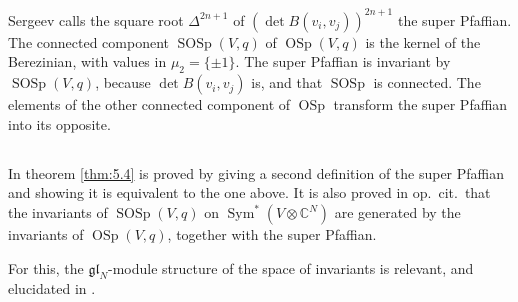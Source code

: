 \documentclass[11pt,a4paper]{article}
\theoremstyle{plain}
\theoremstyle{definition}
\DeclareMathOperator{\OSp}{OSp}
\DeclareMathOperator{\SOSp}{SOSp}
\DeclareMathOperator{\Sym}{Sym}
\newcommand{\C}{\mathbb{C}}
\begin{document}
\subsection{}
Sergeev calls the square root $\Delta^{2n+1}$ of $(\det B(v_i, v_j))^{2n+1}$ the super Pfaffian. The connected component $\SOSp(V,q)$ of $\OSp(V,q)$ is the kernel of the Berezinian, with values in $\mu_2 = \{\pm 1\}$. The super Pfaffian is invariant by $\SOSp(V,q)$, because $\det B(v_i, v_j)$ is, and that $\SOSp$ is connected. The elements of the other connected component of $\OSp$ transform the super Pfaffian into its opposite.

\subsection{}
In \cite{LZ15} theorem \ref{thm:5.4} is proved by giving a second definition of the super Pfaffian and showing it is equivalent to the one above. It is also proved in op.\ cit.\ that the invariants of $\SOSp(V,q)$ on $\Sym^*(V \otimes \C^N)$ are generated by the invariants of $\OSp(V,q)$, together with the super Pfaffian.

For this, the $\mathfrak{gl}_N$-module structure of the space of invariants is relevant, and elucidated in \cite{LZ15}.
\end{document}
